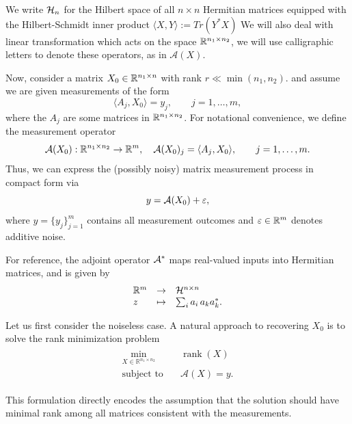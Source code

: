 We write ${\mathcal H}_n$ for the Hilbert space of all $n \times n$ Hermitian matrices equipped
with the Hilbert-Schmidt inner product $\langle X,Y \rangle := Tr(Y^\ast X)$
We will also deal with linear transformation which acts on the space $\mathbb{R}^{n_1\times n_2}$, we will use
calligraphic letters to denote these operators, as in ${\mathcal A}(X)$.

Now, consider a matrix  $X_0 \in \mathbb{R}^{n_1 \times n}$ with rank
$r \ll \min(n_1,n_2)$.
and assume we are given measurements of the form
\begin{equation}
\label{tracemeasures}
\langle A_j,X_0 \rangle  = y_j, \qquad j=1,\dots,m,
\end{equation}
where the $A_j$ are some matrices  in $\mathbb{R}^{n_1 \times n_2}$. For notational convenience, we define the measurement operator
\begin{equation}
\label{tracemeasureop}
{\mathcal A}(X_0): \mathbb{R}^{n_1 \times n_2} \to \mathbb{R}^m, \quad 
{\mathcal A}(X_0)_j = \langle A_j,X_0 \rangle, \qquad j=1,\dots,m.
\end{equation}
Thus, we can express the (possibly noisy) matrix measurement process in compact form via
$$y = {\mathcal A}(X_0) + \varepsilon,$$
where $y=\{y_j\}_{j=1}^m$ contains all measurement outcomes and $\varepsilon \in \mathbb{R}^m$ denotes additive noise.

For reference, the adjoint operator ${\mathcal A}^*$ maps real-valued inputs
into Hermitian matrices, and is given by
\[
\begin{array}{lll}
  \mathbb{R}^{m} & \to & \mathcal{H}^{n \times n}\\
  z & \mapsto & \sum_i a_i \, a_k a_k^*.
\end{array}
\]



Let us first consider the noiseless case. A natural approach to recovering $X_0$ is to solve the rank minimization problem
\begin{align}\label{eq:rankmin}
\begin{split}
\min_{X \in \mathbb{R}^{n_1 \times n_2}} \quad & \operatorname{rank}(X) \\
\text{subject to} \quad & \mathcal{A}(X) = y.
\end{split}
\end{align}

This formulation directly encodes the assumption that the solution should have minimal rank among all matrices consistent with the measurements.

